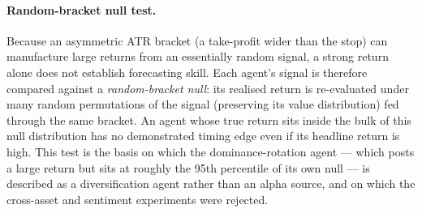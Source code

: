 \paragraph{Random-bracket null test.}
Because an asymmetric ATR bracket (a take-profit wider than the stop) can manufacture large returns from an essentially random signal, a strong return alone does not establish forecasting skill. Each agent's signal is therefore compared against a \textit{random-bracket null}: its realised return is re-evaluated under many random permutations of the signal (preserving its value distribution) fed through the same bracket. An agent whose true return sits inside the bulk of this null distribution has no demonstrated timing edge even if its headline return is high. This test is the basis on which the dominance-rotation agent --- which posts a large return but sits at roughly the 95th percentile of its own null --- is described as a diversification agent rather than an alpha source, and on which the cross-asset and sentiment experiments were rejected.

